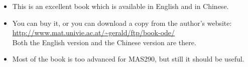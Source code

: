 \documentclass[9pt]{beamer}
\begin{document}
\begin{frame}[t]
\begin{center}
 \end{center}

 \begin{itemize}
  \item<1-> This is an excellent book which is available in English and in Chinese.
  \item<2-> You can buy it, or you can download a copy from the author's website:
   \url{http://www.mat.univie.ac.at/~gerald/ftp/book-ode/}\\
   Both the English version and the Chinese version are there.
  \item<3-> Most of the book is too advanced for MAS290, but still it should be useful.
 \end{itemize}
\end{frame}
\end{document}
